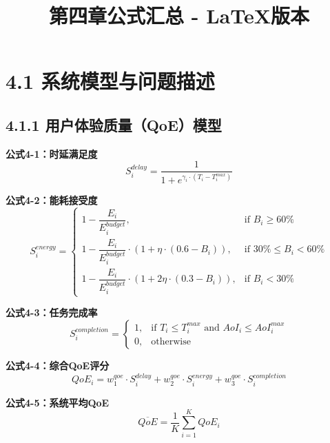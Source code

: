 \documentclass[12pt]{article}
\begin{document}
\title{第四章公式汇总 - LaTeX版本}
\maketitle


\section{4.1 系统模型与问题描述}

\subsection{4.1.1 用户体验质量（QoE）模型}

\textbf{公式4-1：时延满足度}
\begin{equation}
S_i^{delay} = \frac{1}{1 + e^{\gamma_i \cdot (T_i - T_i^{max})}}
\end{equation}

\textbf{公式4-2：能耗接受度}
\begin{equation}
S_i^{energy} = \begin{cases}
1 - \dfrac{E_i}{E_i^{budget}}, & \text{if } B_i \geq 60\% \\[10pt]
1 - \dfrac{E_i}{E_i^{budget}} \cdot (1 + \eta \cdot (0.6 - B_i)), & \text{if } 30\% \leq B_i < 60\% \\[10pt]
1 - \dfrac{E_i}{E_i^{budget}} \cdot (1 + 2\eta \cdot (0.3 - B_i)), & \text{if } B_i < 30\%
\end{cases}
\end{equation}

\textbf{公式4-3：任务完成率}
\begin{equation}
S_i^{completion} = \begin{cases}
1, & \text{if } T_i \leq T_i^{max} \text{ and } AoI_i \leq AoI_i^{max} \\
0, & \text{otherwise}
\end{cases}
\end{equation}

\textbf{公式4-4：综合QoE评分}
\begin{equation}
QoE_i = w_1^{qoe} \cdot S_i^{delay} + w_2^{qoe} \cdot S_i^{energy} + w_3^{qoe} \cdot S_i^{completion}
\end{equation}

\textbf{公式4-5：系统平均QoE}
\begin{equation}
\overline{QoE} = \frac{1}{K} \sum_{i=1}^{K} QoE_i
\end{equation}
\end{document}
